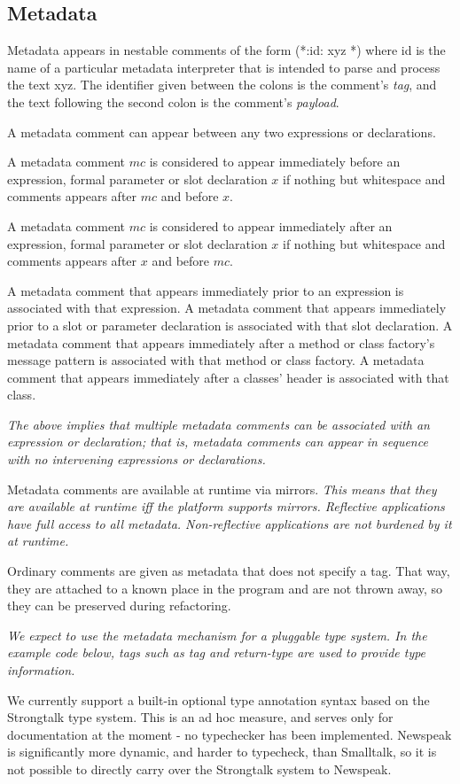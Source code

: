 \documentclass{article}
\newcommand{\code}[1]{{\sf #1}}
\begin{document}
\subsection{Metadata}
\label{metadata}

Metadata appears in nestable comments of the form \code{ (*:id: xyz *)} where \code{id} is the name of a particular metadata interpreter that is intended to parse and process the text \code{xyz}. 
The identifier given between the colons is the comment's  {\em tag}, and the text following the second colon is the comment's {\em payload}.

A metadata comment can appear between any two expressions or declarations.  

A metadata comment $mc$ is considered to appear immediately before an expression, formal parameter or slot declaration  $x$ if nothing but whitespace and comments appears after $mc$ and before $x$.

A metadata comment $mc$ is considered to appear immediately after an expression, formal parameter or slot declaration  $x$ if nothing but whitespace and comments appears after $x$ and before $mc$.

A metadata comment that appears immediately prior to an expression is associated with that expression. A metadata comment that appears immediately prior to a slot or parameter declaration is associated with that slot declaration.
A metadata comment that appears immediately after a method or class factory's message pattern is associated with that method or class factory. A metadata comment that appears immediately after a classes' header is associated with that class. 

{\it The above implies that multiple metadata comments can be associated with an expression or declaration; that is, metadata comments can appear in sequence with no intervening expressions or declarations.
} 

Metadata comments are available at runtime via mirrors.
{\it
This means that they are available at runtime iff the platform supports mirrors. Reflective applications have full access to all metadata. Non-reflective applications are not burdened by it at runtime.
}

Ordinary comments are given as metadata that does not specify a tag. That way, they are attached to a known place in the program and are not thrown away, so they can be preserved during refactoring.


{\it
We expect to use the metadata mechanism for a pluggable type system. In the example code below, tags such as {\em tag} and {\em return-type} are used to provide type information.

We currently support a built-in optional type annotation syntax based on the Strongtalk type system. This is an ad hoc measure, and serves only for documentation at the moment - no typechecker has been implemented. Newspeak is significantly more dynamic, and harder to typecheck, than Smalltalk, so it is not possible to directly carry over the Strongtalk system to Newspeak. 
}
\end{document}
